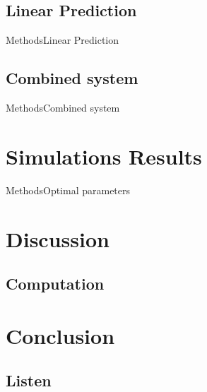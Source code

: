 \subsection{Linear Prediction}
\begin{frame}{Methods}{Linear Prediction}		

\end{frame}

\subsection{Combined system}
\begin{frame}{Methods}{Combined system}		

\end{frame}

\section{Simulations Results}

\begin{frame}{Methods}{Optimal parameters}		

\end{frame}




\section{Discussion}

\subsection{Computation}

\section{Conclusion}

\subsection{Listen}
